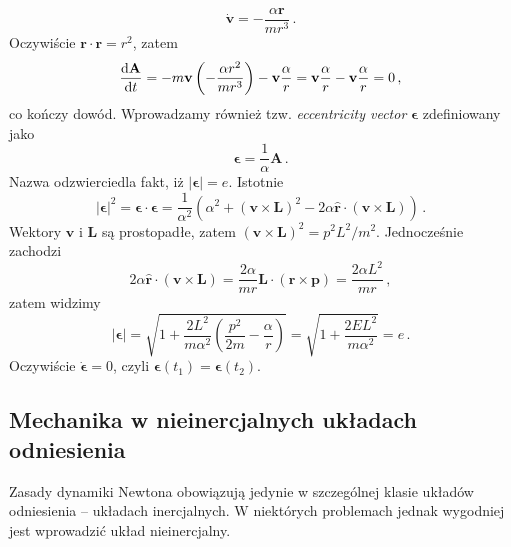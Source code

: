 \documentclass[../main.tex]{subfiles}
\begin{document}
\begin{equation*}
    \dot{\mathbf{v}}=-\frac{\alpha\mathbf{r}}{mr^3}\,.
\end{equation*}
Oczywiście \(\mathbf{r}\cdot\mathbf{r}=r^2\), zatem
\begin{equation*}
    \dv{\mathbf{A}}{t}=-m\mathbf{v}\left(-\frac{\alpha r^2}{mr^3}\right)-\mathbf{v}\frac{\alpha}{r}=\mathbf{v}\frac{\alpha}{r}-\mathbf{v}\frac{\alpha}{r}=0\,,
\end{equation*}
co kończy dowód. Wprowadzamy również tzw. \textit{eccentricity vector} \(\boldsymbol{\epsilon}\) zdefiniowany jako
\begin{equation*}
    \boldsymbol{\epsilon}=\frac{1}{\alpha}\mathbf{A}\,.
\end{equation*}
Nazwa odzwierciedla fakt, iż \(|\boldsymbol{\epsilon}|=e\). Istotnie
\begin{equation*}
    |\boldsymbol{\epsilon}|^2=\boldsymbol{\epsilon}\cdot \boldsymbol{\epsilon}=\frac{1}{\alpha^2}\left(\alpha^2+(\mathbf{v}\times\mathbf{L})^2-2\alpha\mathbf{\hat{r}}\cdot(\mathbf{v}\times\mathbf{L})\right)\,.
\end{equation*}
Wektory \(\mathbf{v}\) i \(\mathbf{L}\) są prostopadłe, zatem \((\mathbf{v}\times\mathbf{L})^2=p^2L^2/m^2\). Jednocześnie zachodzi
\begin{equation*}
    2\alpha\mathbf{\hat{r}}\cdot(\mathbf{v}\times\mathbf{L})=\frac{2\alpha}{mr}\mathbf{L}\cdot(\mathbf{r}\times \mathbf{p})=\frac{2\alpha L^2}{mr}\,,
\end{equation*}
zatem widzimy
\begin{equation*}
    |\boldsymbol{\epsilon}|=\sqrt{1+\frac{2L^2}{m\alpha^2}\left(\frac{p^2}{2m}-\frac{\alpha}{r}\right)}=\sqrt{1+\frac{2EL^2}{m\alpha^2}}=e\,.
\end{equation*}
Oczywiście \(\dot{\boldsymbol{\epsilon}}=0\), czyli \(\boldsymbol{\epsilon}(t_1)=\boldsymbol{\epsilon}(t_2)\).

\subsection{Mechanika w nieinercjalnych układach odniesienia}
Zasady dynamiki Newtona obowiązują jedynie w szczególnej klasie układów odniesienia -- układach inercjalnych. W niektórych problemach jednak wygodniej jest wprowadzić układ nieinercjalny.
\end{document}
